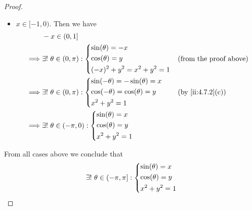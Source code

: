 \begin{proof}
\begin{itemize}
\begin{align*}
          \end{align*}
          But \(\cos\) is strictly decreasing on \((0, \pi)\) implies the choices of \(\theta_1\) and \(\theta_2\) are unique.
          And we conclude that
          \[
            \forall x \in (0, 1], \exists!\ \theta \in (0, \pi) : \begin{dcases}
              \sin(\theta) = x \\
              \cos(\theta) = y \\
              x^2 + y^2 = 1
            \end{dcases}
          \]
    \item \(x \in [-1, 0)\).
          Then we have
          \begin{align*}
                     & -x \in (0, 1]                                                                    \\
            \implies & \exists!\ \theta \in (0, \pi) : \begin{dcases}
                                                         \sin(\theta) = -x \\
                                                         \cos(\theta) = y  \\
                                                         (-x)^2 + y^2 = x^2 + y^2 = 1
                                                       \end{dcases}  &  & \text{(from the proof above)} \\
            \implies & \exists!\ \theta \in (0, \pi) : \begin{dcases}
                                                         \sin(-\theta) = -\sin(\theta) = x \\
                                                         \cos(-\theta) = \cos(\theta) = y  \\
                                                         x^2 + y^2 = 1
                                                       \end{dcases}  &  & \by{ii:4.7.2}[c]              \\
            \implies & \exists!\ \theta \in (-\pi, 0) : \begin{dcases}
                                                          \sin(\theta) = x \\
                                                          \cos(\theta) = y \\
                                                          x^2 + y^2 = 1
                                                        \end{dcases}
          \end{align*}
  \end{itemize}
  From all cases above we conclude that
  \[
    \exists!\ \theta \in (-\pi, \pi] : \begin{dcases}
      \sin(\theta) = x \\
      \cos(\theta) = y \\
      x^2 + y^2 = 1
    \end{dcases}
  \]
\end{proof}

